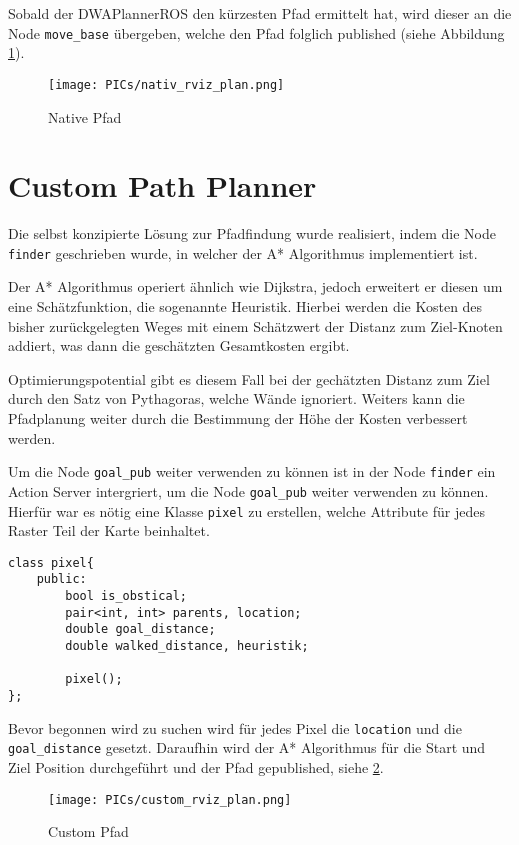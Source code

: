 \documentclass{article}
\begin{document}
Sobald der DWAPlannerROS den kürzesten Pfad ermittelt hat, wird dieser an die Node \verb|move_base| übergeben, welche den Pfad folglich published (siehe Abbildung \ref{path_nativ}).

\begin{figure}[!htbp]
    \centering
    \texttt{[image: PICs/nativ\_rviz\_plan.png]}
    \caption{Native Pfad}\label{path_nativ}
\end{figure}

\section{Custom Path Planner}

Die selbst konzipierte Lösung zur Pfadfindung wurde realisiert, indem die Node \verb|finder| geschrieben wurde, in welcher der A* Algorithmus implementiert ist.

Der A* Algorithmus operiert ähnlich wie Dijkstra, jedoch erweitert er diesen um eine Schätzfunktion, die sogenannte Heuristik. Hierbei werden die Kosten des bisher zurückgelegten Weges mit einem Schätzwert der Distanz zum Ziel-Knoten addiert, was dann die geschätzten Gesamtkosten ergibt. 

Optimierungspotential gibt es diesem Fall bei der gechätzten Distanz zum Ziel durch den Satz von Pythagoras, welche Wände ignoriert. Weiters kann die Pfadplanung weiter durch die Bestimmung der Höhe der Kosten verbessert werden.

Um die Node \verb|goal_pub| weiter verwenden zu können ist in der Node \verb|finder| ein Action Server intergriert, um die Node \verb|goal_pub| weiter verwenden zu können. Hierfür war es nötig eine Klasse \texttt{pixel} zu erstellen, welche Attribute für jedes Raster Teil der Karte beinhaltet.

\begin{lstlisting}
class pixel{
    public:
        bool is_obstical;
        pair<int, int> parents, location;
        double goal_distance;
        double walked_distance, heuristik;

        pixel();
};
\end{lstlisting}

Bevor begonnen wird zu suchen wird für jedes Pixel die \verb|location| und die \verb|goal_distance| gesetzt. 
Daraufhin wird der A* Algorithmus für die Start und Ziel Position durchgeführt und der Pfad gepublished, siehe \ref{path_custom}.

\begin{figure}[!htbp]
    \centering
    \texttt{[image: PICs/custom\_rviz\_plan.png]}
    \caption{Custom Pfad}\label{path_custom}
\end{figure}
\end{document}
